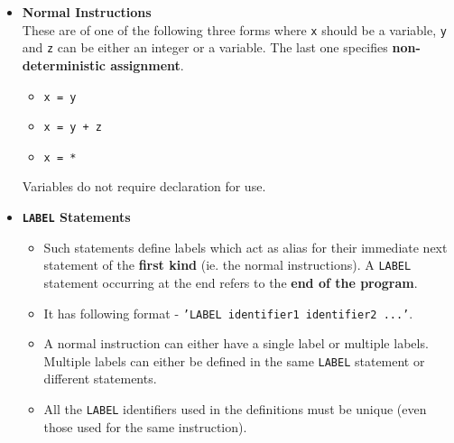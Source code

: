 \begin{itemize} \tightlist
    \item \textbf{Normal Instructions}\\
    These are of one of the following three forms where \texttt{x} should be a variable, \texttt{y} and \texttt{z} can be either an integer or a variable. The last one specifies \textbf{non-deterministic assignment}.
    \begin{itemize} \tightlist
        \item \texttt{x = y}
        \item \texttt{x = y + z}
        \item \texttt{x = *}
    \end{itemize}
    Variables do not require declaration for use.

    \item \textbf{\texttt{LABEL} Statements}
    \begin{itemize} \tightlist
        \item Such statements define labels which act as alias for their 
        immediate next statement of the \textbf{first kind} (ie. the normal 
        instructions). A \texttt{LABEL} statement occurring at the end refers 
        to the \textbf{end of the program}.
        \item It has following format - \texttt{'LABEL identifier1 identifier2 ...'}.
        \item A normal instruction can either have a single label or multiple labels. 
        Multiple labels can either be defined in the same \texttt{LABEL}
        statement or different statements.
        \item All the \texttt{LABEL} identifiers used in the definitions must 
        be unique (even those used for the same instruction).
    \end{itemize}


\end{itemize}
